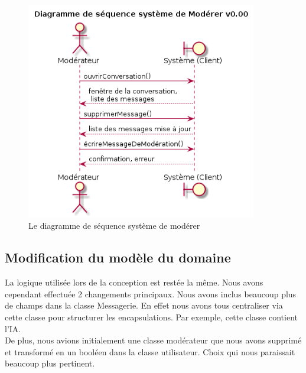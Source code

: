\documentclass[11pt,dvipsnames,svgnames]{report}
\begin{document}
\begin{figure}[H]
\centerline{\includegraphics[width=0.9\textwidth]{diagrammes/dss-moderer.png}}
\caption{Le diagramme de séquence système de \og modérer \fg}
\end{figure}

\subsection{Modification du modèle du domaine}
La logique utilisée lors de la conception est restée la même. Nous avons cependant effectuée 2 changements principaux. Nous avons inclus beaucoup plus de champs dans la classe Messagerie. En effet nous avons tous centraliser via cette classe pour structurer les encapsulations. Par exemple, cette classe contient l'IA. \\
De plus, nous avions initialement une classe modérateur que nous avons supprimé et transformé en un booléen dans la classe utilisateur. Choix qui nous paraissait beaucoup plus pertinent.
\end{document}
